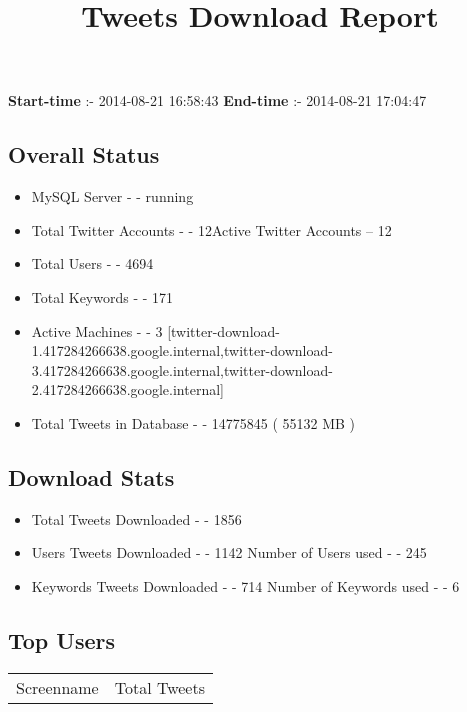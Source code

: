 \documentclass{article}\usepackage[T1]{fontenc}
\begin{document}
\title{\textbf{Tweets Download Report}}
               \date{}
                \maketitle
               \centerline{\textbf{Start-time} :- 2014-08-21 16:58:43 \hspace{40pt} \textbf{End-time} :- 2014-08-21 17:04:47}               \subsection*{Overall Status}                \begin{itemize}                \item MySQL Server - - running               \item Total Twitter Accounts - - 12\newline Active Twitter Accounts -- 12               \item Total Users - - 4694               \item Total Keywords - - 171               \item Active Machines - - 3 [twitter-download-1.417284266638.google.internal,twitter-download-3.417284266638.google.internal,twitter-download-2.417284266638.google.internal]               \item Total Tweets in Database - - 14775845 ( 55132 MB )               \end{itemize}               \subsection*{Download Stats}                \begin{itemize}                \item Total Tweets Downloaded - - 1856               \item Users Tweets Downloaded - - 1142 \newline Number of Users used - - 245               \item Keywords Tweets Downloaded - - 714 \newline Number of Keywords used - - 6              \end{itemize}              \subsection*{Top Users}\begin{tabular}{|c|c|}         \hline         Screenname & Total Tweets \\ 

\end{tabular}
\end{document}
